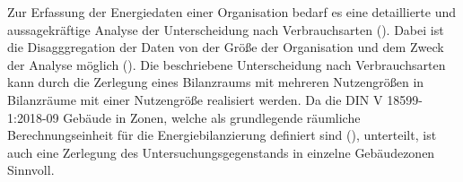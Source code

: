 Zur Erfassung der Energiedaten einer Organisation bedarf es eine detaillierte und aussagekräftige Analyse der Unterscheidung nach Verbrauchsarten 
(\cite[S. 14]{Hohnhold.2013}). Dabei ist die Disagggregation der Daten von der Größe der Organisation und dem Zweck der Analyse möglich (\cite[S. 14f.]{Hohnhold.2013}).
Die beschriebene Unterscheidung nach Verbrauchsarten kann durch die Zerlegung eines Bilanzraums mit mehreren Nutzengrößen in Bilanzräume mit einer Nutzengröße 
realisiert werden. Da die DIN V 18599-1:2018-09 Gebäude in Zonen, welche als grundlegende räumliche Berechnungseinheit für die Energiebilanzierung definiert sind (\cite[Kapitel 3.1.12]{DIN18599.2018}), 
unterteilt, ist auch eine Zerlegung des Untersuchungsgegenstands in einzelne Gebäudezonen Sinnvoll.